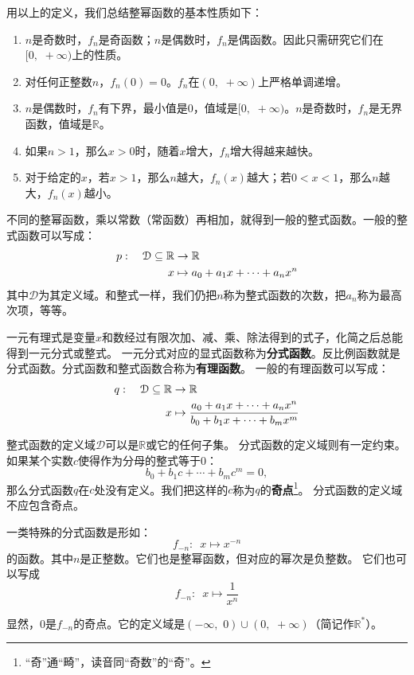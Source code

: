 \documentclass[12pt,UTF8]{ctexbook}
\begin{document}
用以上的定义，我们总结整幂函数的基本性质如下：
\begin{enumerate}
    \item $n$是奇数时，$f_n$是奇函数；$n$是偶数时，$f_n$是偶函数。因此只需研究它们在$[0, \,\, +\infty)$上的性质。
    \item 对任何正整数$n$，$f_n(0) = 0$。$f_n$在$(0, \,\, +\infty)$上严格单调递增。
    \item $n$是偶数时，$f_n$有下界，最小值是$0$，值域是$[0, \,\, +\infty)$。$n$是奇数时，$f_n$是无界函数，值域是$\mathbb{R}$。
    \item 如果$n>1$，那么$x>0$时，随着$x$增大，$f_n$增大得越来越快。
    \item 对于给定的$x$，若$x>1$，那么$n$越大，$f_n(x)$越大；若$0 < x<1$，那么$n$越大，$f_n(x)$越小。
\end{enumerate}

不同的整幂函数，乘以常数（常函数）再相加，就得到一般的整式函数。一般的整式函数可以写成：
\begin{align}
    p: \quad \mathcal{D} \subseteq \mathbb{R} &\rightarrow \mathbb{R} \notag \\
    x &\mapsto a_0 + a_1 x + \cdots + a_n x^n \notag
\end{align}
其中$\mathcal{D}$为其定义域。和整式一样，我们仍把$n$称为整式函数的次数，把$a_n$称为最高次项，等等。

一元有理式是变量$x$和数经过有限次加、减、乘、除法得到的式子，化简之后总能得到一元分式或整式。
一元分式对应的显式函数称为\textbf{分式函数}。反比例函数就是分式函数。分式函数和整式函数合称为\textbf{有理函数}。
一般的有理函数可以写成：
\begin{align}
    q: \quad \mathcal{D} \subseteq \mathbb{R} &\rightarrow \mathbb{R} \notag \\
    x &\mapsto \frac{a_0 + a_1 x + \cdots + a_n x^n}{b_0 + b_1x + \cdots + b_mx^m} \notag
\end{align}

整式函数的定义域$\mathcal{D}$可以是$\mathbb{R}$或它的任何子集。
分式函数的定义域则有一定约束。如果某个实数$c$使得作为分母的整式等于$0$：
$$ b_0 + b_1c + \cdots + b_m c^m = 0, $$
那么分式函数$q$在$c$处没有定义。我们把这样的$c$称为$q$的\textbf{奇点}\footnote{“奇”通“畸”，读音同“奇数”的“奇”。}。
分式函数的定义域不应包含奇点。

一类特殊的分式函数是形如：
$$ f_{-n} : \,\,\, x \mapsto x^{-n}$$
的函数。其中$n$是正整数。它们也是整幂函数，但对应的幂次是负整数。
它们也可以写成
$$ f_{-n} : \,\,\, x \mapsto \frac{1}{x^n}$$

显然，$0$是$f_{-n}$的奇点。它的定义域是$(-\infty,\,\, 0)\cup(0, \,\, +\infty)$（简记作$\mathbb{R}^*$）。
\end{document}
